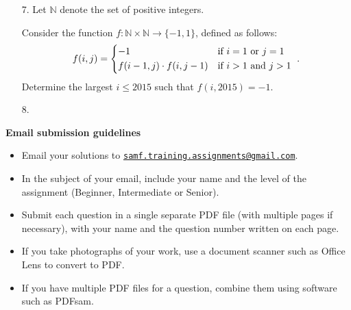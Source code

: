\documentclass{article}
\begin{document}
\begin{enumerate}
\medskip
\item[7.] %
Let $\mathbb{N}$ denote the set of positive integers.

Consider the function $f : \mathbb{N} \times \mathbb{N} \to \{-1,1\}$, defined as follows:
\[ f(i,j) = \begin{dcases*} -1 & if $i = 1$ or $j = 1$ \\ f(i-1,j) \cdot f(i,j-1) & if $i > 1$ and $j > 1$ \end{dcases*}. \]
Determine the largest $i \leq 2015$ such that $f(i,2015) = -1$.


\medskip
\item[8.] %

\end{enumerate}


\vfill
\textbf{\Large Email submission guidelines}
\begin{itemize}
	\item Email your solutions to \href{mailto:samf.training.assignments@gmail.com}{\texttt{samf.training.assignments@gmail.com}}.
	\item In the subject of your email, include your name and the level of the assignment (Beginner, Intermediate or Senior).
	\item Submit each question in a single separate PDF file (with multiple pages if necessary), with your name and the question number written on each page.
	\item If you take photographs of your work, use a document scanner such as Office Lens to convert to PDF.
	\item If you have multiple PDF files for a question, combine them using software such as PDFsam.
\end{itemize}
\end{document}
